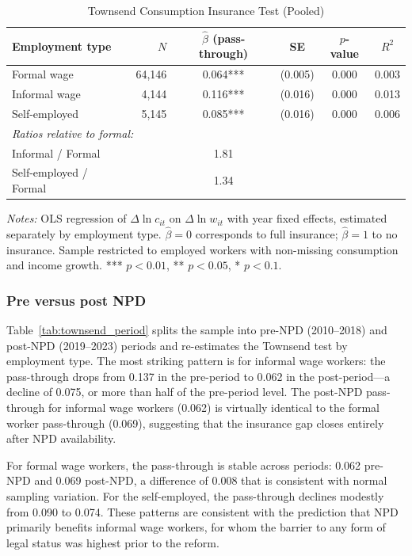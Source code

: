\documentclass[12pt]{article}
\begin{document}
\begin{table}[htbp]
\centering
\caption{Townsend Consumption Insurance Test (Pooled)}
\label{tab:townsend_pooled}
\small
\begin{tabular}{lrcccc}
\toprule
Employment type & $N$ & $\hat{\beta}$ (pass-through) & SE & $p$-value & $R^2$ \\
\midrule
Formal wage & 64,146 & 0.064*** & (0.005) & 0.000 & 0.003 \\
Informal wage & 4,144 & 0.116*** & (0.016) & 0.000 & 0.013 \\
Self-employed & 5,145 & 0.085*** & (0.016) & 0.000 & 0.006 \\
\midrule
\multicolumn{6}{l}{\textit{Ratios relative to formal:}} \\
Informal / Formal & & 1.81 & & & \\
Self-employed / Formal & & 1.34 & & & \\
\bottomrule
\end{tabular}
\begin{minipage}{0.9\textwidth}
\vspace{0.3em}
\footnotesize \textit{Notes:} OLS regression of $\Delta \ln c_{it}$ on $\Delta \ln w_{it}$ with year fixed effects, estimated separately by employment type. $\hat{\beta} = 0$ corresponds to full insurance; $\hat{\beta} = 1$ to no insurance. Sample restricted to employed workers with non-missing consumption and income growth. *** $p < 0.01$, ** $p < 0.05$, * $p < 0.1$.
\end{minipage}
\end{table}

\subsubsection{Pre versus post NPD}

Table~\ref{tab:townsend_period} splits the sample into pre-NPD (2010--2018) and post-NPD (2019--2023) periods and re-estimates the Townsend test by employment type. The most striking pattern is for informal wage workers: the pass-through drops from 0.137 in the pre-period to 0.062 in the post-period---a decline of 0.075, or more than half of the pre-period level. The post-NPD pass-through for informal wage workers (0.062) is virtually identical to the formal worker pass-through (0.069), suggesting that the insurance gap closes entirely after NPD availability.

For formal wage workers, the pass-through is stable across periods: 0.062 pre-NPD and 0.069 post-NPD, a difference of 0.008 that is consistent with normal sampling variation. For the self-employed, the pass-through declines modestly from 0.090 to 0.074. These patterns are consistent with the prediction that NPD primarily benefits informal wage workers, for whom the barrier to any form of legal status was highest prior to the reform.
\end{document}
